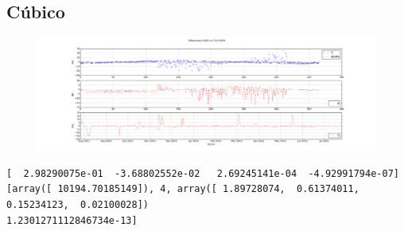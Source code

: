 \subsection{C\'ubico}
\begin{figure}[!h]
\centering
  \includegraphics[width=\textwidth]{imagenes/sacDajusteG3}
\end{figure}
\begin{verbatim}
[  2.98290075e-01  -3.68802552e-02   2.69245141e-04  -4.92991794e-07]
[array([ 10194.70185149]), 4, array([ 1.89728074,  0.61374011,  0.15234123,  0.02100028])
1.2301271112846734e-13]
\end{verbatim}
